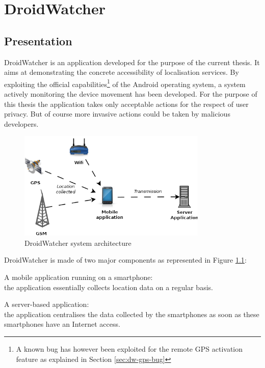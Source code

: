 \chapter{DroidWatcher}
\label{chap:droidwatcher}

\section{Presentation}
\label{sec:dw-presentation}

DroidWatcher is an application developed for the purpose of the current thesis.
It aims at demonstrating the concrete accessibility of localisation services.
By exploiting the official capabilities\footnote{A known bug has however been exploited for the remote GPS activation feature as explained in Section \ref{sec:dw-gps-bug}} of the Android operating system, a system actively monitoring the device movement has been developed.
For the purpose of this thesis the application takes only acceptable actions for the respect of user privacy.
But of course more invasive actions could be taken by malicious developers.

\begin{figure}[h]
  \centering
  \includegraphics[width=9cm]{images/dw-archi.png}
  \caption{DroidWatcher system architecture}
  \label{fig:dw-archi}
\end{figure}

DroidWatcher is made of two major components as represented in Figure \ref{fig:dw-archi}: 

\begin{itemizealt}
\item A mobile application running on a smartphone:\\
  the application essentially collects location data on a regular basis.
\item A server-based application:\\
  the application centralises the data collected by the smartphones as soon as these smartphones have an Internet access.
\end{itemizealt}

